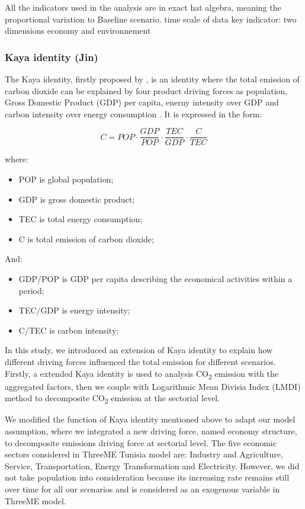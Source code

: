 \documentclass[
]{article}
\providecommand{\tightlist}{%
  \setlength{\itemsep}{0pt}\setlength{\parskip}{0pt}}
\begin{document}
All the indicators used in the analysis are in exact hat algebra,
meaning the proportional variation to Baseline scenario. time scale of
data key indicator: two dimensions economy and environnement

\hypertarget{kaya-identity-jin}{%
\subsubsection{Kaya identity (Jin)}\label{kaya-identity-jin}}

The Kaya identity, firstly proposed by \autocite{kaya1989}, is an
identity where the total emission of carbon dioxide can be explained by
four product driving forces as population, Gross Domestic Product (GDP)
per capita, enerny intensity over GDP and carbon intensity over energy
consumption \autocite{kayaide2021}. It is expressed in the form:

\[ C = POP \cdot \frac{GDP}{POP} \cdot \frac{TEC}{GDP} \cdot \frac{C}{TEC} \tag{1}\]

where:

\begin{itemize}
\tightlist
\item
  POP is global population;
\item
  GDP is gross domestic product;
\item
  TEC is total energy consumption;
\item
  C is total emission of carbon dioxide;
\end{itemize}

And:

\begin{itemize}
\tightlist
\item
  GDP/POP is GDP per capita describing the economical activities within
  a period;
\item
  TEC/GDP is energy intensity;
\item
  C/TEC is carbon intensity;
\end{itemize}

In this study, we introduced an extension of Kaya identity to explain
how different driving forces influenced the total emission for different
scenarios. Firstly, a extended Kaya identity is used to analysis
CO\textsubscript{2} emission with the aggregated factors, then we couple
with Logarithmic Mean Divisia Index (LMDI) method to decomposite
CO\textsubscript{2} emission at the sectorial level.

We modified the function of Kaya identity mentioned above to adapt our
model assumption, where we integrated a new driving force, named economy
structure, to decomposite emissions driving force at sectorial level.
The five economic sectors considered in ThreeME Tunisia model are:
Industry and Agriculture, Service, Transportation, Energy Transformation
and Electricity. However, we did not take population into consideration
because its increasing rate remains still over time for all our
scenarios and is considered as an exogenous variable in ThreeME model.
\end{document}
